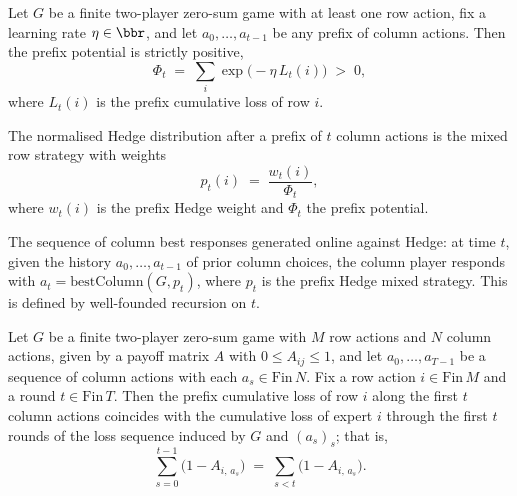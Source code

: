 \begin{lemma}
\label{prefixPotential_pos}
\leanok
{}
Let $G$ be a finite two-player zero-sum game with at least one row action, fix a
learning rate $\eta \in \bbr$, and let $a_0, \dots, a_{t-1}$ be any prefix of column
actions. Then the prefix potential is strictly positive,
\[
  \Phi_t \;=\; \sum_{i} \exp\!\bigl(-\eta\, L_t(i)\bigr) \;>\; 0,
\]
where $L_t(i)$ is the prefix cumulative loss of row $i$.
\end{lemma}

\begin{definition}
\label{prefixHedgeMixedStrategy}
\leanok
{}
The normalised Hedge distribution after a prefix of $t$ column actions is the
mixed row strategy with weights
\[
  p_t(i) \;=\; \frac{w_t(i)}{\Phi_t},
\]
where $w_t(i)$ is the prefix Hedge weight and $\Phi_t$ the prefix potential.
\end{definition}

\begin{definition}
\label{hedgeResponseNat}
\leanok
{}
The sequence of column best responses generated online against Hedge: at time
$t$, given the history $a_0, \dots, a_{t-1}$ of prior column choices, the
column player responds with $a_t = \mathrm{bestColumn}(G, p_t)$, where $p_t$
is the prefix Hedge mixed strategy.  This is defined by well-founded recursion
on $t$.
\end{definition}

\begin{lemma}
\label{prefixGameLoss_eq_cumLoss}
\leanok
{}
Let $G$ be a finite two-player zero-sum game with $M$ row actions and $N$ column
actions, given by a payoff matrix $A$ with $0 \le A_{ij} \le 1$, and let $a_0, \dots,
a_{T-1}$ be a sequence of column actions with each $a_s \in \mathrm{Fin}\,N$. Fix a row
action $i \in \mathrm{Fin}\,M$ and a round $t \in \mathrm{Fin}\,T$. Then the prefix
cumulative loss of row $i$ along the first $t$ column actions coincides with the
cumulative loss of expert $i$ through the first $t$ rounds of the loss sequence induced
by $G$ and $(a_s)_s$; that is,
\[
\sum_{s=0}^{t-1} \bigl(1 - A_{i,\,a_s}\bigr) \;=\; \sum_{s < t} \bigl(1 -
A_{i,\,a_s}\bigr).
\]
\end{lemma}

